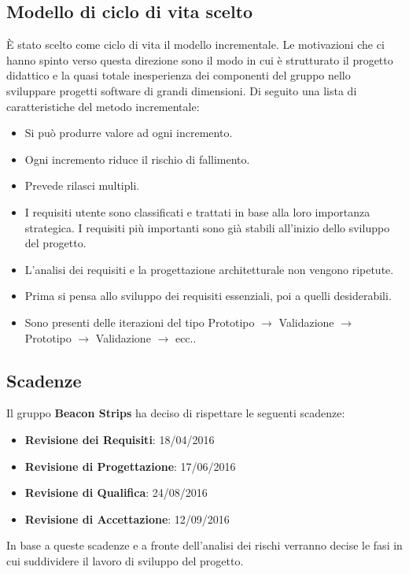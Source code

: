	\subsection{Modello di ciclo di vita scelto}
	È stato scelto come ciclo di vita il modello incrementale. Le motivazioni che ci hanno spinto verso questa direzione sono il modo in cui è strutturato il progetto didattico e la quasi totale inesperienza dei componenti del gruppo nello sviluppare progetti software di grandi dimensioni. Di seguito una lista di caratteristiche del metodo incrementale:
	\begin{itemize}
		\item Si può produrre valore ad ogni incremento.
		\item Ogni incremento riduce il rischio di fallimento.
		\item Prevede rilasci multipli.
		\item I requisiti utente sono classificati e trattati in base alla loro importanza strategica. I requisiti più importanti sono già stabili all'inizio dello sviluppo del progetto.
		\item L'analisi dei requisiti e la progettazione architetturale non vengono ripetute.
		\item Prima si pensa allo sviluppo dei requisiti essenziali, poi a quelli desiderabili.
		\item Sono presenti delle iterazioni del tipo Prototipo $\rightarrow$ Validazione $\rightarrow$ Prototipo $\rightarrow$ Validazione $\rightarrow$ ecc..
	\end{itemize}
	\subsection{Scadenze}
	Il gruppo \textbf{Beacon Strips} ha deciso di rispettare le seguenti scadenze:
	\begin{itemize}
		\item \textbf{Revisione dei Requisiti}: 18/04/2016
		\item \textbf{Revisione di Progettazione}: 17/06/2016
		\item \textbf{Revisione di Qualifica}: 24/08/2016
		\item \textbf{Revisione di Accettazione}: 12/09/2016
	\end{itemize}
	In base a queste scadenze e a fronte dell'analisi dei rischi verranno decise le fasi in cui suddividere il lavoro di sviluppo del progetto.
	
	